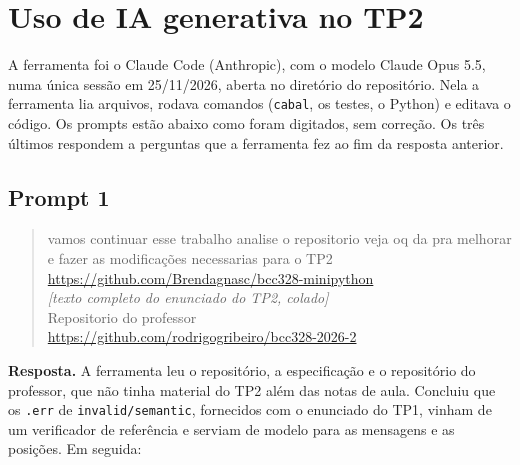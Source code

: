 
\section{Uso de IA generativa no TP2}
\label{sec:ia}

A ferramenta foi o Claude Code (Anthropic), com o modelo Claude Opus
5.5, numa única sessão em 25/11/2026, aberta no diretório do
repositório. Nela a ferramenta lia arquivos, rodava comandos
(\texttt{cabal}, os testes, o Python) e editava o código. Os prompts
estão abaixo como foram digitados, sem correção. Os três últimos
respondem a perguntas que a ferramenta fez ao fim da resposta anterior.

\subsection*{Prompt 1}

\begin{quote}
vamos continuar esse trabalho analise o repositorio veja oq da pra
melhorar e fazer as modificações necessarias para o TP2\\
\url{https://github.com/Brendagnasc/bcc328-minipython}\\
\emph{[texto completo do enunciado do TP2, colado]}\\
Repositorio do professor\\
\url{https://github.com/rodrigogribeiro/bcc328-2026-2}
\end{quote}

\textbf{Resposta.} A ferramenta leu o repositório, a especificação e o
repositório do professor, que não tinha material do TP2 além das notas
de aula. Concluiu que os \texttt{.err} de \texttt{invalid/semantic},
fornecidos com o enunciado do TP1, vinham de um verificador de
referência e serviam de modelo para as mensagens e as posições. Em
seguida:

